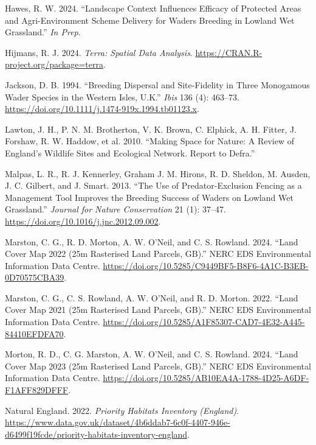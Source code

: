 \documentclass[
  12pt,
  letterpaper,
  DIV=11,
  numbers=noendperiod]{scrartcl}
\newlength{\cslhangindent}
\newenvironment{CSLReferences}[2] %
 {\begin{list}{}{%
  \setlength{\itemindent}{0pt}
  \setlength{\leftmargin}{0pt}
  \setlength{\parsep}{0pt}
  \ifodd #1
   \setlength{\leftmargin}{\cslhangindent}
   \setlength{\itemindent}{-1\cslhangindent}
  \fi
  \setlength{\itemsep}{#2\baselineskip}}}
 {\end{list}}
\begin{document}
\begin{CSLReferences}{1}{0}
Hawes, R. W. 2024. {``Landscape Context Influences Efficacy of Protected
Areas and Agri-Environment Scheme Delivery for Waders Breeding in
Lowland Wet Grassland.''} \emph{In Prep}.

Hijmans, R. J. 2024. \emph{Terra: Spatial Data Analysis}.
\url{https://CRAN.R-project.org/package=terra}.

Jackson, D. B. 1994. {``Breeding Dispersal and Site{-}Fidelity in Three
Monogamous Wader Species in the Western Isles, U.K.''} \emph{Ibis} 136
(4): 463--73. \url{https://doi.org/10.1111/j.1474-919x.1994.tb01123.x}.

Lawton, J. H., P. N. M. Brotherton, V. K. Brown, C. Elphick, A. H.
Fitter, J. Forshaw, R. W. Haddow, et al. 2010. {``Making Space for
Nature: A Review of England's Wildlife Sites and Ecological Network.
Report to Defra.''}

Malpas, L. R., R. J. Kennerley, Graham J. M. Hirons, R. D. Sheldon, M.
Ausden, J. C. Gilbert, and J. Smart. 2013. {``The Use of
Predator-Exclusion Fencing as a Management Tool Improves the Breeding
Success of Waders on Lowland Wet Grassland.''} \emph{Journal for Nature
Conservation} 21 (1): 37--47.
\url{https://doi.org/10.1016/j.jnc.2012.09.002}.

Marston, C. G., R. D. Morton, A. W. O'Neil, and C. S. Rowland. 2024.
{``Land Cover Map 2022 (25m Rasterised Land Parcels, GB).''} NERC EDS
Environmental Information Data Centre.
\url{https://doi.org/10.5285/C9449BF5-B8F6-4A1C-B3EB-0D70575CBA39}.

Marston, C. G., C. S. Rowland, A. W. O'Neil, and R. D. Morton. 2022.
{``Land Cover Map 2021 (25m Rasterised Land Parcels, GB).''} NERC EDS
Environmental Information Data Centre.
\url{https://doi.org/10.5285/A1F85307-CAD7-4E32-A445-84410EFDFA70}.

Morton, R. D., C. G. Marston, A. W. O'Neil, and C. S. Rowland. 2024.
{``Land Cover Map 2023 (25m Rasterised Land Parcels, GB).''} NERC EDS
Environmental Information Data Centre.
\url{https://doi.org/10.5285/AB10EA4A-1788-4D25-A6DF-F1AFF829DFFF}.

Natural England. 2022. \emph{Priority Habitats Inventory (England)}.
\url{https://www.data.gov.uk/dataset/4b6ddab7-6c0f-4407-946e-d6499f19fcde/priority-habitats-inventory-england}.


\end{CSLReferences}
\end{document}
